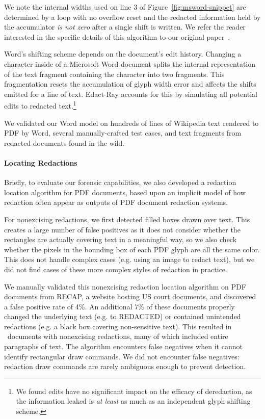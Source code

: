 We note the internal widths used on line 3 of Figure~\ref{fig:msword-snippet} are determined by a loop with no overflow reset and the redacted information held by the accumulator \emph{is not zero} after a single shift is written.
We refer the reader interested in the specific details of this algorithm to our original paper~\cite{bland2023story}.

Word's shifting scheme depends on the document's edit history. 
Changing a character inside of a Microsoft Word document splits the internal representation of the text fragment containing the character into two fragments. 
This fragmentation resets the accumulation of glyph width error and affects the shifts emitted for a line of text. 
Edact-Ray accounts for this by simulating all potential edits to redacted text.\footnote{
    We found edits have no significant impact on the efficacy of deredaction, as the information leaked is \emph{at least} as much as an independent glyph shifting scheme.
    }

We validated our Word model on hundreds of lines of Wikipedia text rendered to PDF by Word, several manually-crafted test cases, and text fragments from redacted documents found in the wild.



\paragraph{Locating Redactions}
Briefly, to evaluate our forensic capabilities, we also developed a redaction location algorithm for PDF documents, based upon an implicit model of how redaction often appear as outputs of PDF document redaction systems.

For nonexcising redactions, we first detected filled boxes drawn over text.
This creates a large number of false positives as it does not consider whether the rectangles are actually covering text in a meaningful way, so we also check whether the pixels in the bounding box of each PDF glyph are all the same color.
This does not handle complex cases (e.g. using an image to redact text), but we did not find cases of these more complex styles of redaction in practice.

We manually validated this nonexcising redaction location algorithm on PDF documents from RECAP, a website hosting US court documents, and discovered a false positive rate of 4\%.
An additional 7\% of these documents properly changed the underlying text (e.g. to REDACTED) or contained unintended redactions (e.g. a black box covering non-sensitive text).
This resulted in \numRECAPredactionDocs\ documents with nonexcising redactions, many of which included entire paragraphs of text.
The algorithm encounters false negatives when it cannot identify rectangular draw commands.
We did not encounter false negatives: redaction draw commands are rarely ambiguous enough to prevent detection.

